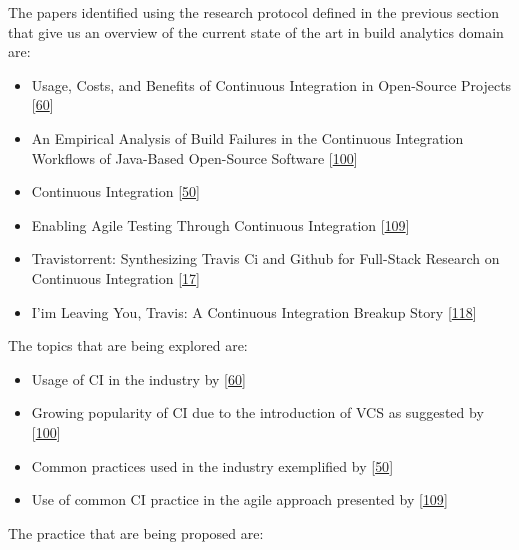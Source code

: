 \documentclass[]{book}
\providecommand{\tightlist}{%
  \setlength{\itemsep}{0pt}\setlength{\parskip}{0pt}}
\begin{document}
The papers identified using the research protocol defined in the
previous section that give us an overview of the current state of the
art in build analytics domain are:

\begin{itemize}
\tightlist
\item
  Usage, Costs, and Benefits of Continuous Integration in Open-Source
  Projects {[}\protect\hyperlink{ref-hilton2016usage}{60}{]}
\item
  An Empirical Analysis of Build Failures in the Continuous Integration
  Workflows of Java-Based Open-Source Software
  {[}\protect\hyperlink{ref-rausch2017empirical}{100}{]}
\item
  Continuous Integration
  {[}\protect\hyperlink{ref-fowler2006continuous}{50}{]}
\item
  Enabling Agile Testing Through Continuous Integration
  {[}\protect\hyperlink{ref-stolberg2009enabling}{109}{]}
\item
  Travistorrent: Synthesizing Travis Ci and Github for Full-Stack
  Research on Continuous Integration
  {[}\protect\hyperlink{ref-beller2017travistorrent}{17}{]}
\item
  I'im Leaving You, Travis: A Continuous Integration Breakup Story
  {[}\protect\hyperlink{ref-widder2018m}{118}{]}
\end{itemize}

The topics that are being explored are:

\begin{itemize}
\tightlist
\item
  Usage of CI in the industry by
  {[}\protect\hyperlink{ref-hilton2016usage}{60}{]}
\item
  Growing popularity of CI due to the introduction of VCS as suggested
  by {[}\protect\hyperlink{ref-rausch2017empirical}{100}{]}
\item
  Common practices used in the industry exemplified by
  {[}\protect\hyperlink{ref-fowler2006continuous}{50}{]}
\item
  Use of common CI practice in the agile approach presented by
  {[}\protect\hyperlink{ref-stolberg2009enabling}{109}{]}
\end{itemize}

The practice that are being proposed are:
\end{document}
